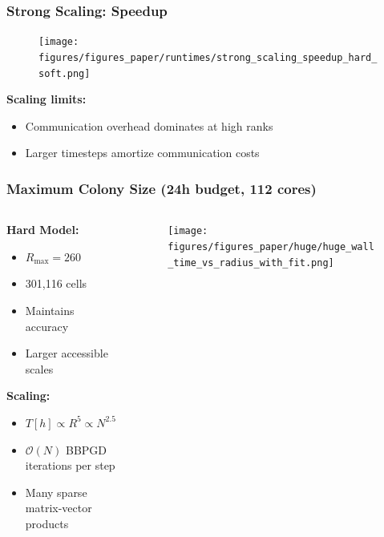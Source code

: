 \documentclass[10pt,t]{beamer}
\begin{document}
\begin{frame}
    \frametitle{Strong Scaling: Speedup}

    \begin{figure}
        \centering
        \texttt{[image: figures/figures\_paper/runtimes/strong\_scaling\_speedup\_hard\_soft.png]}
    \end{figure}

    \textbf{Scaling limits:}
    \begin{itemize}
        \item Communication overhead dominates at high ranks
        \item Larger timesteps amortize communication costs
    \end{itemize}

\end{frame}

\begin{frame}
    \frametitle{Maximum Colony Size (24h budget, 112 cores)}

    \begin{columns}
        \begin{column}{0.4\textwidth}
            \textbf{Hard Model:}
            \begin{itemize}
                \item $R_{\max} = 260$
                \item 301,116 cells
                \item Maintains accuracy
                \item Larger accessible scales
            \end{itemize}

            \vspace{0.2cm}

            \textbf{Scaling:}
            \begin{itemize}
                \item $T[h] \propto R^5 \propto N^{2.5}$
                \item $\mathcal{O}(N)$ BBPGD iterations per step
                \item Many sparse matrix-vector products
            \end{itemize}
        \end{column}

        \begin{column}{0.6\textwidth}
            \begin{figure}
                \centering
                \texttt{[image: figures/figures\_paper/huge/huge\_wall\_time\_vs\_radius\_with\_fit.png]}
            \end{figure}
        \end{column}

    \end{columns}

\end{frame}
\end{document}
